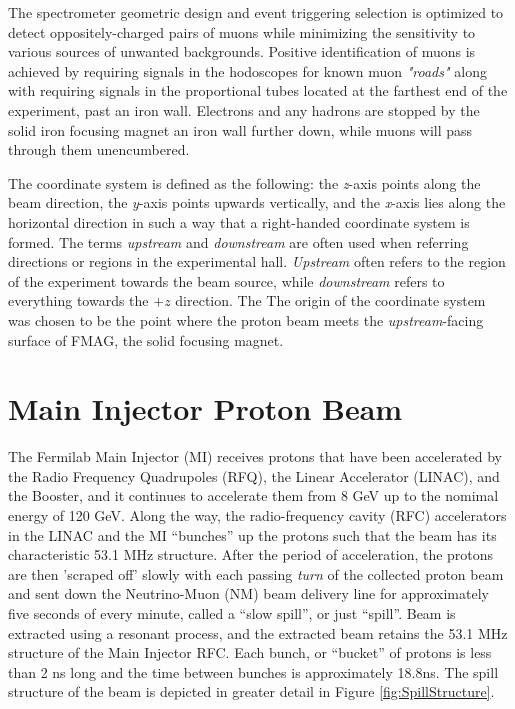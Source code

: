 The spectrometer geometric design and event
triggering selection is optimized to detect oppositely-charged pairs of muons while minimizing the sensitivity
to various sources of unwanted backgrounds. Positive identification of muons is achieved by requiring signals
in the hodoscopes for known muon \emph{"roads"} along with requiring signals in the proportional tubes located at
the farthest end of the experiment, past an iron wall. Electrons and any hadrons are stopped by the solid iron
focusing magnet an iron wall further down, while muons will pass through them unencumbered.

The coordinate system is defined as the following: the \emph{z}-axis points along the beam direction, the
\emph{y}-axis points upwards vertically, and the \emph{x}-axis lies along the horizontal direction
in such a way that a right-handed coordinate system is formed. The terms \emph{upstream} and 
\emph{downstream} are often used when referring directions or regions in the experimental hall.
\emph{Upstream} often refers to the region of the experiment towards the beam source, while
\emph{downstream} refers to everything towards the $+z$ direction. 
The The origin of the coordinate system was chosen to be the point where the proton beam meets 
the \emph{upstream}-facing surface of FMAG, the solid focusing magnet.


\section{Main Injector Proton Beam}


The Fermilab Main Injector (MI) receives protons that have been accelerated by the Radio Frequency Quadrupoles (RFQ), the Linear Accelerator (LINAC), and the Booster, and it continues to accelerate them from 8 GeV up to the nomimal energy of 120 GeV. Along the way, the radio-frequency cavity (RFC) accelerators in the LINAC and the MI ``bunches'' up the protons such that the beam has its characteristic 53.1 MHz structure. After the period of acceleration, the protons are then 'scraped off' slowly with each passing \emph{turn} of the collected proton beam and sent down the Neutrino-Muon (NM) beam delivery line for approximately five seconds of every minute, called a ``slow spill'', or just ``spill''. Beam is extracted using a resonant process, and the extracted beam retains the 53.1 MHz structure of the Main Injector RFC. Each bunch, or ``bucket'' of protons is less than 2 ns long and the time between bunches is approximately 18.8ns. The spill structure of the beam is depicted in greater detail in Figure \ref{fig:SpillStructure}.

